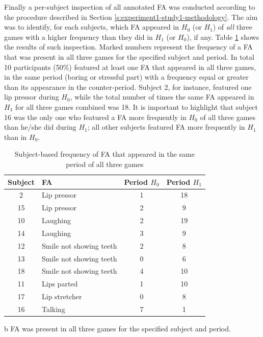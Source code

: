 Finally a per-subject inspection of all annotated FA was conducted according to the procedure described in Section \ref{s:experiment1-study1-methodology}. The aim was to identify, for each subjects, which FA appeared in $H_0$ (or $H_1$) of \emph{all} three games with a higher frequency than they did in $H_1$ (or $H_0$), if any. Table \ref{table:individual} shows the results of such inspection. Marked numbers represent the frequency of a FA that was present in all three games for the specified subject and period. In total 10 participants (50\%) featured at least one FA that appeared in all three games, in the same period (boring or stressful part) with a frequency equal or greater than its appearance in the counter-period. Subject 2, for instance, featured one lip pressor during $H_0$, while the total number of times the same FA appeared in $H_1$ for all three games combined was 18. It is important to highlight that subject 16 was the only one who featured a FA more frequently in $H_0$ of all three games than he/she did during $H_1$; all other subjects featured FA more frequently in $H_1$ than in $H_0$.

\begin{table}[!h]
\caption{Subject-based frequency of FA that appeared in the same period of all three games}
\label{table:individual}
\centering
\begin{threeparttable}
\begin{tabular}{cp{.4\linewidth}cc}
\toprule%
\textbf{Subject} & \textbf{FA} & \textbf{Period $H_0$} & \textbf{Period $H_1$} \\
\toprule%
2 & Lip pressor & 1 & 18\tnote{b} \\
\midrule
15 & Lip pressor & 2 & 9\tnote{b} \\
\midrule
10 & Laughing & 2 & 19\tnote{b} \\
\midrule
14 & Laughing & 3 & 9\tnote{b} \\
\midrule
12 & Smile not showing teeth & 2 & 8\tnote{b} \\
\midrule
13 & Smile not showing teeth & 0 & 6\tnote{b} \\
\midrule
18 & Smile not showing teeth & 4 & 10\tnote{b} \\
\midrule
11 & Lips parted & 1 & 10\tnote{b} \\
\midrule
17 & Lip stretcher & 0 & 8\tnote{b} \\
\midrule
16 & Talking & 7\tnote{b} & 1 \\
\bottomrule
\end{tabular}
\begin{tablenotes}
\small
\item[b]{FA was present in all three games for the specified subject and period.}
\end{tablenotes}
\end{threeparttable}
\end{table}

